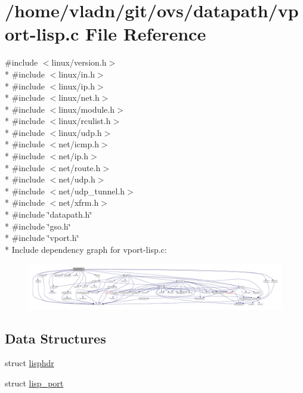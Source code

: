 \hypertarget{vport-lisp_8c}{}\section{/home/vladn/git/ovs/datapath/vport-\/lisp.c File Reference}
\label{vport-lisp_8c}
{\ttfamily \#include $<$linux/version.\+h$>$}\\*
{\ttfamily \#include $<$linux/in.\+h$>$}\\*
{\ttfamily \#include $<$linux/ip.\+h$>$}\\*
{\ttfamily \#include $<$linux/net.\+h$>$}\\*
{\ttfamily \#include $<$linux/module.\+h$>$}\\*
{\ttfamily \#include $<$linux/rculist.\+h$>$}\\*
{\ttfamily \#include $<$linux/udp.\+h$>$}\\*
{\ttfamily \#include $<$net/icmp.\+h$>$}\\*
{\ttfamily \#include $<$net/ip.\+h$>$}\\*
{\ttfamily \#include $<$net/route.\+h$>$}\\*
{\ttfamily \#include $<$net/udp.\+h$>$}\\*
{\ttfamily \#include $<$net/udp\+\_\+tunnel.\+h$>$}\\*
{\ttfamily \#include $<$net/xfrm.\+h$>$}\\*
{\ttfamily \#include \char`\"{}datapath.\+h\char`\"{}}\\*
{\ttfamily \#include \char`\"{}gso.\+h\char`\"{}}\\*
{\ttfamily \#include \char`\"{}vport.\+h\char`\"{}}\\*
Include dependency graph for vport-\/lisp.c\+:
\nopagebreak
\begin{figure}[H]
\begin{center}
\leavevmode
\includegraphics[width=350pt]{vport-lisp_8c__incl}
\end{center}
\end{figure}
\subsection*{Data Structures}
\begin{DoxyCompactItemize}
\item 
struct \hyperlink{structlisphdr}{lisphdr}
\item 
struct \hyperlink{structlisp__port}{lisp\+\_\+port}
\end{DoxyCompactItemize}
